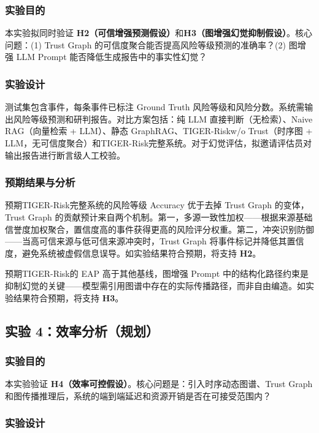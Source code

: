 \documentclass[12pt,a4paper]{article}
\newcommand{\projectshort}{TIGER-Risk}
\begin{document}
\subsubsection{实验目的}

本实验拟同时验证 \textbf{H2（可信增强预测假设）}和\textbf{H3（图增强幻觉抑制假设）}。核心问题：(1) Trust Graph 的可信度聚合能否提高风险等级预测的准确率？(2) 图增强 LLM Prompt 能否降低生成报告中的事实性幻觉？

\subsubsection{实验设计}

测试集包含事件，每条事件已标注 Ground Truth 风险等级和风险分数。系统需输出风险等级预测和研判报告。对比方案包括：纯 LLM 直接判断（无检索）、Naive RAG（向量检索 + LLM）、静态 GraphRAG、\projectshort w/o Trust（时序图 + LLM，无可信度聚合）和\projectshort 完整系统。对于幻觉评估，拟邀请评估员对输出报告进行断言级人工校验。

\subsubsection{预期结果与分析}

预期\projectshort 完整系统的风险等级 Accuracy 优于去掉 Trust Graph 的变体，Trust Graph 的贡献预计来自两个机制。第一，多源一致性加权——根据来源基础信誉度加权聚合，置信度高的事件获得更高的风险评分权重。第二，冲突识别防御——当高可信来源与低可信来源冲突时，Trust Graph 将事件标记并降低其置信度，避免系统被虚假信息误导。如实验结果符合预期，将支持 \textbf{H2}。

预期\projectshort 的 EAP 高于其他基线，图增强 Prompt 中的结构化路径约束是抑制幻觉的关键——模型需引用图谱中存在的实际传播路径，而非自由编造。如实验结果符合预期，将支持 \textbf{H3}。

\subsection{实验 4：效率分析（规划）}
\label{sec:exp-efficiency}

\subsubsection{实验目的}

本实验验证 \textbf{H4（效率可控假设）}。核心问题是：引入时序动态图谱、Trust Graph 和图传播推理后，系统的端到端延迟和资源开销是否在可接受范围内？

\subsubsection{实验设计}
\end{document}

